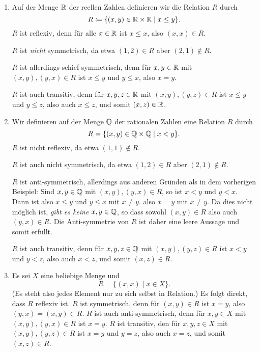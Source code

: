 \begin{bsp}
 \begin{enumerate}[leftmargin=*]
  
  \item
   Auf der Menge $\mathbb{R}$ der reellen Zahlen definieren wir die Relation $R$ durch
   \[
    R \coloneqq \{(x,y) \in \mathbb{R} \times \mathbb{R} \mid x \leq y\}.
   \]
   $R$ ist reflexiv, denn für alle $x \in \mathbb{R}$ ist $x \leq x$, also $(x,x) \in R$.
   
   $R$ ist \emph{nicht} symmetrisch, da etwa $(1,2) \in R$ aber $(2,1) \notin R$.
   
   $R$ ist allerdings schief-symmetrisch, denn für $x,y \in \mathbb{R}$ mit $(x,y), (y,x) \in R$ ist $x \leq y$ und $y \leq x$, also $x = y$.
   
   $R$ ist auch transitiv, denn für $x,y,z \in \mathbb{R}$ mit $(x,y), (y,z) \in R$ ist $x \leq y$ und $y \leq z$, also auch $x \leq z$, und somit $(x,z) \in \mathbb{R}$.
  
  \item
   Wir definieren auf der Menge $\mathbb{Q}$ der rationalen Zahlen eine Relation $R$ durch
   \[
    R = \{(x,y) \in \mathbb{Q} \times \mathbb{Q} \mid x < y\}.
   \]
   $R$ ist nicht reflexiv, da etwa $(1,1) \notin R$.
   
   $R$ ist auch nicht symmetrisch, da etwa $(1,2) \in R$ aber $(2,1) \notin R$.
   
   $R$ ist anti-symmetrisch, allerdings aus anderen Gründen als in dem vorherigen Beispiel: Sind $x,y \in \mathbb{Q}$ mit $(x,y), (y,x) \in R$, so ist $x < y$ und $y < x$. Dann ist also $x \leq y$ und $y \leq x$ mit $x \neq y$. also $x = y$ mit $x \neq y$. Da dies nicht möglich ist, \emph{gibt es keine} $x,y \in \mathbb{Q}$, so dass sowohl $(x,y) \in R$ also auch $(y,x) \in R$. Die Anti-symmetrie von $R$ ist daher eine leere Aussage und somit erfüllt.
   
   $R$ ist auch transitiv, denn für $x,y,z \in \mathbb{Q}$ mit $(x,y), (y,z) \in R$ ist $x < y$ und $y < z$, also auch $x < z$, und somit $(x,z) \in R$.
  
  \item
   Es sei $X$ eine beliebige Menge und
   \[
    R = \{(x,x) \mid x \in X\}.
   \]
   (Es steht also jedes Element nur zu sich selbst in Relation.) Es folgt direkt, dass $R$ reflexiv ist. $R$ ist symmetrisch, denn für $(x,y) \in R$ ist $x = y$, also $(y,x) = (x,y) \in R$. $R$ ist auch anti-symmetrisch, denn für $x,y \in X$ mit $(x,y), (y,x) \in R$ ist $x = y$. $R$ ist transitiv, den für $x,y,z \in X$ mit $(x,y), (y,z) \in R$ ist $x = y$ und $y = z$, also auch $x = z$, und somit $(x,z) \in R$.
  

\end{enumerate}
\end{bsp}
